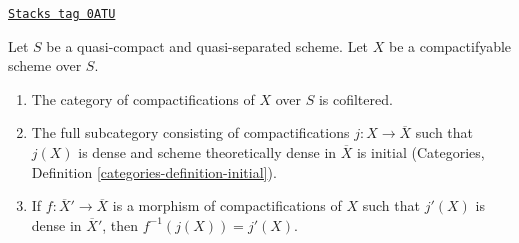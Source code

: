 \begin{lemma}
\label{flat-lemma-compactifications-cofiltered}
\href{https://stacks.math.columbia.edu/tag/0ATU}{\texttt{Stacks tag 0ATU}}

Let $S$ be a quasi-compact and quasi-separated scheme.
Let $X$ be a compactifyable scheme over $S$.
\begin{enumerate}
\item[(a)] The category of compactifications of $X$ over $S$ is
cofiltered.
\item[(b)] The full subcategory consisting of compactifications
$j : X \to \overline{X}$ such that $j(X)$ is dense and
scheme theoretically dense in $\overline{X}$ is initial
(Categories, Definition \ref{categories-definition-initial}).
\item[(c)] If $f : \overline{X}' \to \overline{X}$ is a morphism
of compactifications of $X$ such that $j'(X)$ is dense in $\overline{X}'$,
then $f^{-1}(j(X)) = j'(X)$.
\end{enumerate}
\end{lemma}

